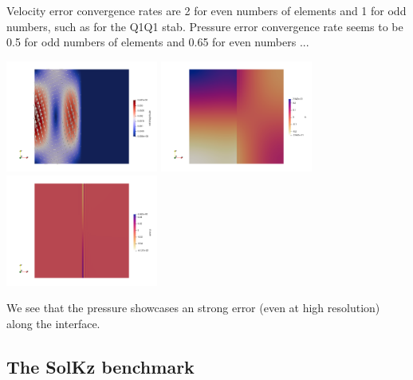 Velocity error convergence rates are 2 for even numbers of elements and 1 for odd numbers, 
such as for the Q1Q1 stab. 
Pressure error convergence rate seems to be 0.5 for odd numbers of elements and
0.65 for even numbers ... 

\begin{center}
\includegraphics[width=5cm]{python_codes/fieldstone_72/results/solcx/vel}
\includegraphics[width=5cm]{python_codes/fieldstone_72/results/solcx/p}
\includegraphics[width=5cm]{python_codes/fieldstone_72/results/solcx/p_error}
\end{center}

We see that the pressure showcases an strong error (even at high resolution)
along the interface. 


\subsection*{The SolKz benchmark}


